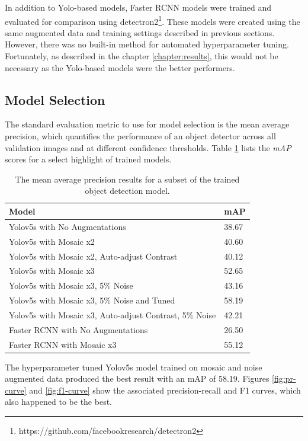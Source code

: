 \documentclass{thesis}
\begin{document}
In addition to Yolo-based models, Faster RCNN models were trained and evaluated for comparison using detectron2\footnote{https://github.com/facebookresearch/detectron2}. These models were created using the same augmented data and training settings described in previous sections. However, there was no built-in method for automated hyperparameter tuning. Fortunately, as described in the chapter \ref{chapter:results}, this would not be necessary as the Yolo-based models were the better performers.

\subsection{Model Selection}

The standard evaluation metric to use for model selection is the mean average precision, which quantifies the performance of an object detector across all validation images and at different confidence thresholds. Table \ref{table:model-mAP} lists the \textit{mAP} scores for a select highlight of trained models.

\begin{table}[ht!]
    \centering
    \begin{tabular}{|l| |l|} 
     \hline
     \textbf{Model} & \textbf{mAP} \\
     \hline\hline
     Yolov5s with No Augmentations & 38.67 \\
     Yolov5s with Mosaic x2 & 40.60  \\
     Yolov5s with Mosaic x2, Auto-adjust Contrast & 40.12  \\
     Yolov5s with Mosaic x3 & 52.65 \\
     Yolov5s with Mosaic x3, 5\% Noise & 43.16 \\
     Yolov5s with Mosaic x3, 5\% Noise and Tuned & 58.19 \\
     Yolov5s with Mosaic x3, Auto-adjust Contrast, 5\% Noise & 42.21 \\
     Faster RCNN with No Augmentations & 26.50 \\
     Faster RCNN with Mosaic x3 & 55.12 \\
     \hline
    \end{tabular}
    \hspace{100mm}
    \caption{The mean average precision results for a subset of the trained object detection model.}
    \label{table:model-mAP}
\end{table}

The hyperparameter tuned Yolov5s model trained on mosaic and noise augmented data produced the best result with an mAP of 58.19. Figures \ref{fig:pr-curve} and \ref{fig:f1-curve} show the associated precision-recall and F1 curves, which also happened to be the best. 
\end{document}
